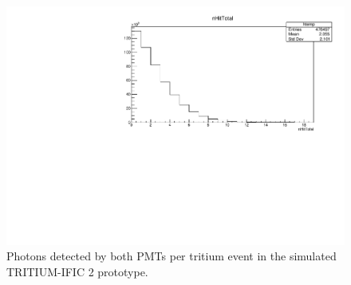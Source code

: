 \begin{figure}[hbtp]
\centering
\includegraphics[scale=0.65]{Figures/8SimulationsResults/82TRITIUMMonitor/821TRITIUMIFIC2/PhotonsDetected_simulation.pdf}
\caption{Photons detected by both PMTs per tritium event in the simulated TRITIUM-IFIC 2 prototype.\label{fig:SimulatedPhotonsDetected}}
\end{figure}

